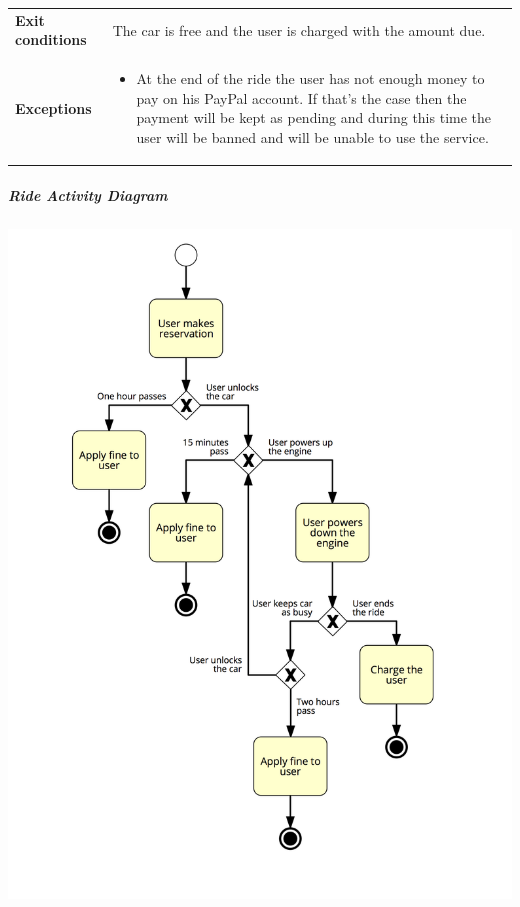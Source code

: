 \documentclass[]{article}
\providecommand{\tightlist}{%
  \setlength{\itemsep}{0pt}\setlength{\parskip}{0pt}}
\let\oldsubparagraph\subparagraph
\renewcommand{\subparagraph}[1]{\oldsubparagraph{#1}\mbox{}}
\begin{document}
\begin{longtable}[]{@{}ll@{}}
\begin{minipage}[t]{0.29\columnwidth}
\textbf{Exit conditions}\strut
\end{minipage} & \begin{minipage}[t]{0.65\columnwidth}\raggedright\strut
The car is free and the user is charged with the amount due.\strut
\end{minipage}\tabularnewline
\begin{minipage}[t]{0.29\columnwidth}\raggedright\strut
\textbf{Exceptions}\strut
\end{minipage} & \begin{minipage}[t]{0.65\columnwidth}\raggedright\strut
\begin{itemize}
\tightlist
\item
  At the end of the ride the user has not enough money to pay on his
  PayPal account. If that's the case then the payment will be kept as
  pending and during this time the user will be banned and will be
  unable to use the service.
\end{itemize}\strut
\end{minipage}\tabularnewline
\bottomrule
\end{longtable}

\newpage

\subparagraph{\texorpdfstring{Ride Activity Diagram
\newline}{Ride Activity Diagram }}\label{ride-activity-diagram}

\centerline{\includegraphics[width=6.25000in]{./FlowDiagrams/RideFlowAD.png}}
\end{document}
